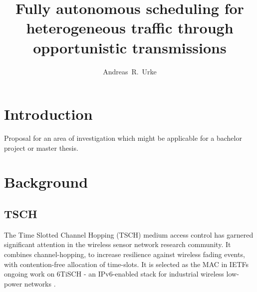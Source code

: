 \documentclass[journal,comsoc]{IEEEtran}
\begin{document}
\title{Fully autonomous scheduling for heterogeneous traffic through opportunistic transmissions}

\author{Andreas~R.~Urke

}


\maketitle

%


\section{Introduction}
Proposal for an area of investigation which might be applicable for a bachelor project or master thesis.

\section{Background}
\subsection{TSCH}
The Time Slotted Channel Hopping (TSCH) medium access control has garnered significant attention in the wireless sensor network research community. It combines channel-hopping, to increase resilience against wireless fading events, with contention-free allocation of time-slots. It is selected as the MAC in IETFs ongoing work on 6TiSCH - an IPv6-enabled stack for industrial wireless low-power networks \cite{IETF6TiSCHTutorialVilajosana2019}.
\end{document}

